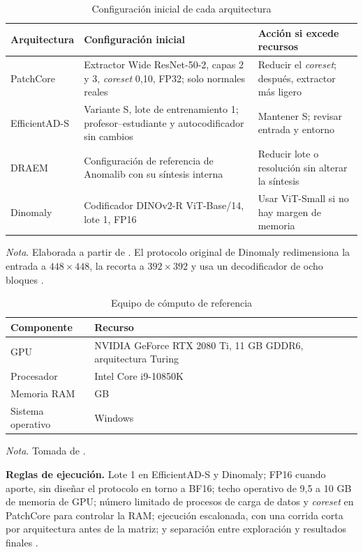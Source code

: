 \documentclass[12pt,oneside]{report}
\newcommand{\nota}[1]{\par\noindent\textit{Nota}. #1\par}
\begin{document}
\begin{table}[H]
\singlespacing\setlength{\parindent}{0pt}\setlength{\RaggedRightParindent}{0pt}
\caption{Configuración inicial de cada arquitectura}
\label{tab:configuracion}
\begin{tabularx}{\textwidth}{@{}>{\RaggedRight\arraybackslash}p{2.4cm}>{\RaggedRight\arraybackslash}X>{\RaggedRight\arraybackslash}p{4.4cm}@{}}
\toprule
Arquitectura & Configuración inicial & Acción si excede recursos \\
\midrule
PatchCore & Extractor Wide ResNet-50-2, capas 2 y 3, \textit{coreset} 0,10, FP32; solo normales reales & Reducir el \textit{coreset}; después, extractor más ligero \\
EfficientAD-S & Variante S, lote de entrenamiento 1; profesor--estudiante y autocodificador sin cambios & Mantener S; revisar entrada y entorno \\
DRAEM & Configuración de referencia de Anomalib con su síntesis interna & Reducir lote o resolución sin alterar la síntesis \\
Dinomaly & Codificador DINOv2-R ViT-Base/14, lote 1, FP16 & Usar ViT-Small si no hay margen de memoria \\
\bottomrule
\end{tabularx}
\nota{Elaborada a partir de \cite{paez2026,akcay2022}. El protocolo original de Dinomaly redimensiona la entrada a $448 \times 448$, la recorta a $392 \times 392$ y usa un decodificador de ocho bloques \cite{guo2025supp}.}
\end{table}

\begin{table}[H]
\singlespacing\setlength{\parindent}{0pt}\setlength{\RaggedRightParindent}{0pt}
\caption{Equipo de cómputo de referencia}
\label{tab:hardware}
\begin{tabularx}{\textwidth}{@{}>{\RaggedRight\arraybackslash}p{4cm}>{\RaggedRight\arraybackslash}X@{}}
\toprule
Componente & Recurso \\
\midrule
GPU & NVIDIA GeForce RTX 2080 Ti, 11 GB GDDR6, arquitectura Turing \\
Procesador & Intel Core i9-10850K \\
Memoria RAM & 16 GB \\
Sistema operativo & Windows \\
\bottomrule
\end{tabularx}
\nota{Tomada de \cite{paez2026}.}
\end{table}

\noindent\textbf{Reglas de ejecución.} Lote 1 en EfficientAD-S y Dinomaly; FP16 cuando aporte, sin diseñar el protocolo en torno a BF16; techo operativo de 9,5 a 10 GB de memoria de GPU; número limitado de procesos de carga de datos y \textit{coreset} en PatchCore para controlar la RAM; ejecución escalonada, con una corrida corta por arquitectura antes de la matriz; y separación entre exploración y resultados finales \cite{paez2026}.
\end{document}
